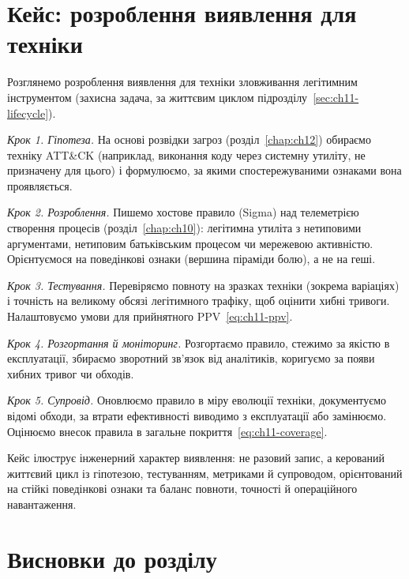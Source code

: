 \section{Кейс: розроблення виявлення для техніки}\label{sec:ch11-case}

Розглянемо розроблення виявлення для техніки зловживання легітимним інструментом (захисна задача, за життєвим циклом підрозділу~\ref{sec:ch11-lifecycle}).

\emph{Крок 1. Гіпотеза.} На основі розвідки загроз (розділ~\ref{chap:ch12}) обираємо техніку ATT\&CK (наприклад, виконання коду через системну утиліту, не призначену для цього) і формулюємо, за якими спостережуваними ознаками вона проявляється.

\emph{Крок 2. Розроблення.} Пишемо хостове правило (Sigma) над телеметрією створення процесів (розділ~\ref{chap:ch10}): легітимна утиліта з нетиповими аргументами, нетиповим батьківським процесом чи мережевою активністю. Орієнтуємося на поведінкові ознаки (вершина піраміди болю), а не на геші.

\emph{Крок 3. Тестування.} Перевіряємо повноту на зразках техніки (зокрема варіаціях) і точність на великому обсязі легітимного трафіку, щоб оцінити хибні тривоги. Налаштовуємо умови для прийнятного PPV~\eqref{eq:ch11-ppv}.

\emph{Крок 4. Розгортання й моніторинг.} Розгортаємо правило, стежимо за якістю в експлуатації, збираємо зворотний зв'язок від аналітиків, коригуємо за появи хибних тривог чи обходів.

\emph{Крок 5. Супровід.} Оновлюємо правило в міру еволюції техніки, документуємо відомі обходи, за втрати ефективності виводимо з експлуатації або замінюємо. Оцінюємо внесок правила в загальне покриття~\eqref{eq:ch11-coverage}.

Кейс ілюструє інженерний характер виявлення: не разовий запис, а керований життєвий цикл із гіпотезою, тестуванням, метриками й супроводом, орієнтований на стійкі поведінкові ознаки та баланс повноти, точності й операційного навантаження.

\section*{Висновки до розділу}

